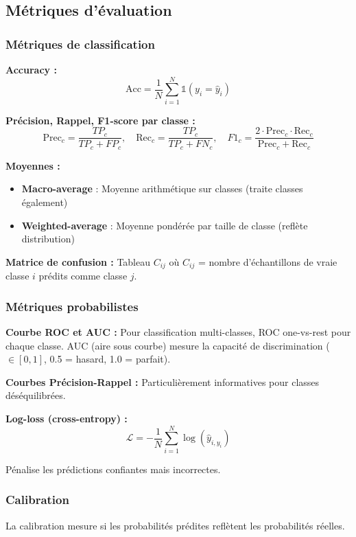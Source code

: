 \subsection{Métriques d'évaluation}

\subsubsection{Métriques de classification}

\textbf{Accuracy :}
\[
\text{Acc} = \frac{1}{N}\sum_{i=1}^N \mathbb{1}(y_i = \hat{y}_i)
\]

\textbf{Précision, Rappel, F1-score par classe :}
\[
\text{Prec}_c = \frac{TP_c}{TP_c + FP_c}, \quad \text{Rec}_c = \frac{TP_c}{TP_c + FN_c}, \quad F1_c = \frac{2 \cdot \text{Prec}_c \cdot \text{Rec}_c}{\text{Prec}_c + \text{Rec}_c}
\]

\textbf{Moyennes :}
\begin{itemize}
    \item \textbf{Macro-average} : Moyenne arithmétique sur classes (traite classes également)
    \item \textbf{Weighted-average} : Moyenne pondérée par taille de classe (reflète distribution)
\end{itemize}

\textbf{Matrice de confusion :}
Tableau $C_{ij}$ où $C_{ij}$ = nombre d'échantillons de vraie classe $i$ prédits comme classe $j$.

\subsubsection{Métriques probabilistes}

\textbf{Courbe ROC et AUC :}
Pour classification multi-classes, ROC one-vs-rest pour chaque classe. AUC (aire sous courbe) mesure la capacité de discrimination ($\in [0,1]$, 0.5 = hasard, 1.0 = parfait).

\textbf{Courbes Précision-Rappel :}
Particulièrement informatives pour classes déséquilibrées.

\textbf{Log-loss (cross-entropy) :}
\[
\mathcal{L} = -\frac{1}{N}\sum_{i=1}^N \log(\hat{y}_{i, y_i})
\]

Pénalise les prédictions confiantes mais incorrectes.

\subsubsection{Calibration}

La calibration mesure si les probabilités prédites reflètent les probabilités réelles.

